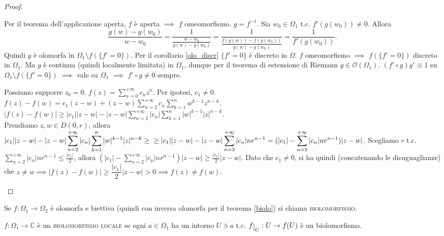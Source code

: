 \begin{proof}
  \begin{nlist}
    \item Per il teorema dell'applicazione aperta, $f$ è aperta $\implies$ $f$ omeomorfismo. $g=f^{-1}$. Sia $w_0 \in \Omega_1$ t.c. $f'(g(w_0)) \not=0$. Allora
    $$ \frac{g(w)-g(w_0)}{w-w_0}=\frac{1}{\frac{w-w_0}{g(w)-g(w_0)}}=\frac{1}{\frac{f(g(w))-f(g(w_0))}{g(w)-g(w_0)}}=\frac{1}{f'(g(w_0))}. $$
    Quindi $g$ è olomorfa in $\Omega_1 \setminus f(\{f'=0\})$. Per il corollario \ref{olo_discr} $\{f'=0\}$ è discreto in $\Omega$. $f$ omeomorfismo $\implies$ $f(\{f'=0\})$ discreto in $\Omega_1$.
    Ma $g$ è continua (quindi localmente limitata) in $\Omega_1$, dunque per il teorema di estensione di Riemann $g \in \mathcal{O}(\Omega_1)$. $(f' \circ g)g' \equiv 1$ su $\Omega_1 \setminus f(\{f'=0\})$ $\implies$ vale su $\Omega_1$ $\implies$ $f'\circ g \not=0$ sempre.
    \item Possiamo supporre $z_0=0$. $\displaystyle f(z)=\sum_{n=0}^{+\infty} c_nz^n$. Per ipotesi, $c_1 \not=0$. \\
    $\displaystyle f(z)-f(w)=c_1(z-w)+(z-w)\sum_{n=2}^{+\infty} c_n\sum_{k=1}^n w^{k-1}z^{n-k}$. \\
    $\displaystyle |f(z)-f(w)| \ge |c_1||z-w|-|z-w|\sum_{n=2}^{+\infty} |c_n|\sum_{k=1}^n |w|^{k-1}|z|^{n-k}$. \\
    Prendiamo $z, w \in D(0, r)$, allora \\
    $\displaystyle |c_1||z-w|-|z-w|\sum_{n=2}^{+\infty} |c_n|\sum_{k=1}^n |w|^{k-1}|z|^{n-k} \ge \\
    \ge |c_1||z-w|-|z-w|\sum_{n=2}^{+\infty} |c_n|nr^{n-1}=(|c_1|-\sum_{n=2}^{+\infty} |c_n|nr^{n-1})|z-w|$.
    Scegliamo $r$ t.c. $\displaystyle \sum_{n=2}^{+\infty} |c_n|nr^{n-1} \le \frac{|c_1|}{2}$, allora $\displaystyle (|c_1|-\sum_{n=2}^{+\infty} |c_n|nr^{n-1})|z-w| \ge \frac{|c_1|}{2}|z-w|$.
    Dato che $c_1 \not=0$, si ha quindi (concatenando le disuguaglianze) che $z \not=w \implies |f(z)-f(w)| \ge \dfrac{|c_1|}{2}|z-w|>0 \implies f(z) \not= f(w)$.
  \end{nlist}
\end{proof}

\begin{defn}
  Se $f: \Omega_1 \rightarrow \Omega_2$ è olomorfa e biettiva (quindi con inversa olomorfa per il teorema \ref{biolo}) si chiama \textsc{biolomorfismo}.
\end{defn}

\begin{defn}
  $f:\Omega_1 \rightarrow \mathbb{C}$ è un \textsc{biolomorfismo locale} se ogni $a \in \Omega_1$ ha un intorno $U \ni a$ t.c. $f\restrict{U}:U \rightarrow f(U)$ è un biolomorfismo.
\end{defn}

